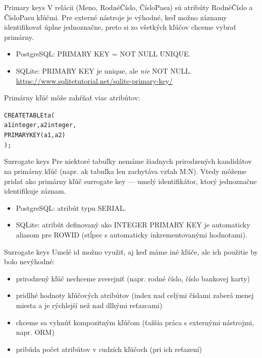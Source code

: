 \documentclass[12pt]{beamer}
\begin{document}
\begin{frame}[fragile]{Primary keys}
V relácii (Meno, RodnéČíslo, ČísloPasu) sú atribúty RodnéČíslo a ČísloPasu kľúčmi.
Pre externé nástroje je výhodné, keď možno záznamy identifikovať úplne jednoznačne,
preto si zo všetkých kľúčov chceme vybrať primárny.
\begin{itemize}
\item PostgreSQL: \alert{PRIMARY KEY} = NOT NULL UNIQUE.
\item SQLite: PRIMARY KEY je unique, ale \emph{nie} NOT NULL.\\
      {\scriptsize \url{https://www.sqlitetutorial.net/sqlite-primary-key/}}
\end{itemize}

\bigskip
Primárny kľúč môže zahŕňať viac atribútov:
\begin{alltt}
CREATE TABLE ta (
  a1 integer, a2 integer,
  \alert{PRIMARY KEY (a1, a2)}
);
\end{alltt}
\end{frame}

\begin{frame}[fragile]{Surrogate keys}
Pre niektoré tabuľky nemáme žiadnych prirodzených kandidátov na primárny kľúč
(napr. ak tabuľka len zachytáva vzťah M:N). Vtedy môžeme pridať ako primárny kľúč
\alert{surrogate key} --- umelý identifikátor, ktorý jednoznačne identifikuje záznam.

\begin{itemize}
\item PostgreSQL: atribút typu SERIAL.
\item SQLite: atribút definovaný ako INTEGER PRIMARY KEY je automaticky aliasom pre ROWID
(stĺpec s automaticky inkrementovanými hodnotami).
\end{itemize}
\end{frame}

\begin{frame}[fragile]{Surrogate keys}
Umelé id možno využiť, aj keď máme iné kľúče, ale ich použitie by bolo nevýhodné:
\begin{itemize}
\item prirodzený kľúč nechceme zverejniť (napr. rodné číslo, číslo bankovej karty)
\item pridlhé hodnoty kľúčových atribútov (index nad celými číslami zaberá menej miesta
a je rýchlejší než nad dlhými reťazcami)
\item chceme sa vyhnúť kompozitným kľúčom (ťažšia práca s externými nástrojmi, napr. ORM)
\item pribúda počet atribútov v cudzích kľúčoch (pri ich reťazení)
\end{itemize}
\end{frame}
\end{document}
